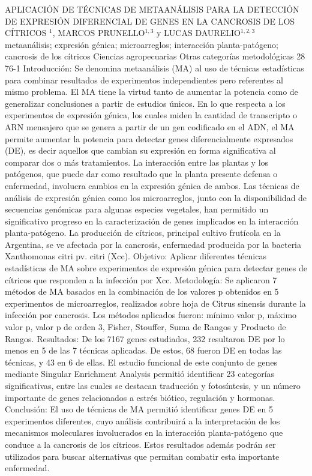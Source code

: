 \A
{APLICACIÓN DE TÉCNICAS DE METAANÁLISIS PARA LA DETECCIÓN DE EXPRESIÓN DIFERENCIAL DE GENES EN LA CANCROSIS DE LOS CÍTRICOS}
{$^1$, MARCOS PRUNELLO$^{1,3}$ y LUCAS DAURELIO$^{1,2,3}$}
{
\\}
{metaanálisis; expresión génica; microarreglos; interacción planta-patógeno; cancrosis de los cítricos} 
 {Ciencias agropecuarias} 
 {Otras categorías metodológicas} 
 {28} 
 {76-1}
{Introducción: Se denomina metaanálisis (MA) al uso de técnicas estadísticas para combinar resultados de experimentos independientes pero referentes al mismo problema. El MA tiene la virtud tanto de aumentar la potencia como de generalizar conclusiones a partir de estudios únicos. En lo que respecta a los experimentos de expresión génica, los cuales miden la cantidad de transcripto o ARN mensajero que se genera a partir de un gen codificado en el ADN, el MA permite aumentar la potencia para detectar genes diferencialmente expresados (DE), es decir aquellos que cambian su expresión en forma significativa al comparar dos o más tratamientos. La interacción entre las plantas y los patógenos, que puede dar como resultado que la planta presente defensa o enfermedad, involucra cambios en la expresión génica de ambos. Las técnicas de análisis de expresión génica como los microarreglos, junto con la disponibilidad de secuencias genómicas para algunas especies vegetales, han permitido un significativo progreso en la caracterización de genes implicados en la interacción planta-patógeno. La producción de cítricos, principal cultivo frutícola en la Argentina, se ve afectada por la cancrosis, enfermedad producida por la bacteria Xanthomonas citri pv. citri (Xcc). Objetivo: Aplicar diferentes técnicas estadísticas de MA sobre experimentos de expresión génica para detectar genes de cítricos que responden a la infección por Xcc. Metodología: Se aplicaron 7 métodos de MA basados en la combinación de los valores p obtenidos en 5 experimentos de microarreglos, realizados sobre hoja de Citrus sinensis durante la infección por cancrosis. Los métodos aplicados fueron: mínimo valor p, máximo valor p, valor p de orden 3, Fisher, Stouffer, Suma de Rangos y Producto de Rangos. Resultados: De los 7167 genes estudiados, 232 resultaron DE por lo menos en 5 de las 7 técnicas aplicadas. De estos, 68 fueron DE en todas las técnicas, y 43 en 6 de ellas. El estudio funcional de este conjunto de genes mediante Singular Enrichment Analysis permitió identificar 23 categorías significativas, entre las cuales se destacan traducción y fotosíntesis, y un número importante de genes relacionados a estrés biótico, regulación y hormonas. Conclusión: El uso de técnicas de MA permitió identificar genes DE en 5 experimentos diferentes, cuyo análisis contribuirá a la interpretación de los mecanismos moleculares involucrados en la interacción planta-patógeno que conduce a la cancrosis de los cítricos. Estos resultados además podrán ser utilizados para buscar alternativas que permitan combatir esta importante enfermedad. }

